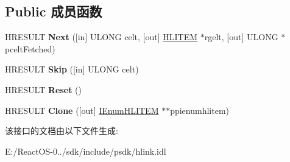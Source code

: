 \subsection*{Public 成员函数}
\begin{DoxyCompactItemize}
\item 
\mbox{\label{interface_i_enum_h_l_i_t_e_m_ac07cea5fcd50a4996adf9908bf8e7177}} 
H\+R\+E\+S\+U\+LT {\bfseries Next} (\mbox{[}in\mbox{]} U\+L\+O\+NG celt, \mbox{[}out\mbox{]} \hyperlink{struct_i_enum_h_l_i_t_e_m_1_1tag_h_l_i_t_e_m}{H\+L\+I\+T\+EM} $\ast$rgelt, \mbox{[}out\mbox{]} U\+L\+O\+NG $\ast$pcelt\+Fetched)
\item 
\mbox{\label{interface_i_enum_h_l_i_t_e_m_a0582df4748a39f89266fc5f883ec55d5}} 
H\+R\+E\+S\+U\+LT {\bfseries Skip} (\mbox{[}in\mbox{]} U\+L\+O\+NG celt)
\item 
\mbox{\label{interface_i_enum_h_l_i_t_e_m_a49f2f9c971ec285666dc790e17afc0b5}} 
H\+R\+E\+S\+U\+LT {\bfseries Reset} ()
\item 
\mbox{\label{interface_i_enum_h_l_i_t_e_m_a9af576fda06c8ff2c143083ab6cd5fc2}} 
H\+R\+E\+S\+U\+LT {\bfseries Clone} (\mbox{[}out\mbox{]} \hyperlink{interface_i_enum_h_l_i_t_e_m}{I\+Enum\+H\+L\+I\+T\+EM} $\ast$$\ast$ppienumhlitem)
\end{DoxyCompactItemize}


该接口的文档由以下文件生成\+:\begin{DoxyCompactItemize}
\item 
E\+:/\+React\+O\+S-\/0../sdk/include/psdk/hlink.\+idl\end{DoxyCompactItemize}
